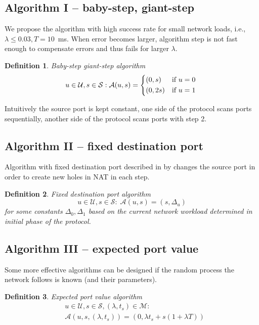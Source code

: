 \documentclass[twoside]{article}
\newtheorem{mydef}{Definition}
\begin{document}
\begin{multicols}{2}
\subsection{Algorithm I -- baby-step, giant-step}
We propose the algorithm with high success rate for small network loads, i.e.,
$\lambda \leq 0.03, T=10$~ms. When error becomes larger,
algorithm step is not fast enough to compensate errors and thus fails for larger $\lambda$.

\begin{mydef}
Baby-step giant-step algorithm
\[
u \in \mathcal{U}, s \in \mathcal{S}: 
\mathcal{A}(u, s) = \begin{dcases*}
         (0, s)  & \text{if} $u=0$\\
         (0, 2s) & \text{if} $u=1$
        \end{dcases*}
\]
\end{mydef}

Intuitively the source port is kept constant, one side of the protocol scans ports sequentially, another
side of the protocol scans ports with step 2.

\subsection{Algorithm II -- fixed destination port}
Algorithm with fixed destination port described in by \citep{Wang:2006:RSN:1156422.1156550}
changes the source port in order to create new holes in NAT in each step.

\begin{mydef}
Fixed destination port algorithm
\[
u \in \mathcal{U}, s \in \mathcal{S}: \;
\mathcal{A}(u, s) = (s, \Delta_u)
\] for some constants $\Delta_0, \Delta_1$ based on the current network workload determined in initial phase
of the protocol.
\end{mydef}

\subsection{Algorithm III -- expected port value}
Some more effective algorithms can be designed if the random process the network follows is known (and their
parameters).

\begin{mydef}
Expected port value algorithm
\begin{align*}
& u \in \mathcal{U}, s \in \mathcal{S}, (\lambda, t_s) \in \mathcal{M}:\\
& \mathcal{A}(u, s, (\lambda, t_s)) = (0, \lambda t_s + s(1 + \lambda T))
\end{align*}
\end{mydef}


\end{multicols}
\end{document}
